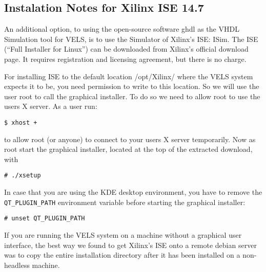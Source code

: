 
\subsection{Instalation Notes for Xilinx ISE 14.7}\label{ISE-install}

An additional option, to using the open-source software ghdl as the VHDL Simulation tool for VELS, is to use the Simulator of Xilinx's ISE: ISim. The ISE (``Full Installer for Linux'') can be downloaded from Xilinx's official download page. It requires registration and licensing agreement, but there is no charge.

For installing ISE to the default location /opt/Xilinx/ where the VELS system expects it to be, you need permission to write to this location. So we will use the user root to call the graphical installer. To do so we need to allow root to use the users X server. As a user run:

\begin{verbatim}
$ xhost +
\end{verbatim}

to allow root (or anyone) to connect to your users X server temporarily. Now as root start the graphical installer, located at the top of the extracted download, with

\begin{verbatim}
# ./xsetup
\end{verbatim}

In case that you are using the KDE desktop environment, you have to remove the \verb!QT_PLUGIN_PATH! environment variable before starting the graphical installer:

\begin{verbatim}
# unset QT_PLUGIN_PATH
\end{verbatim}

If you are running the VELS system on a machine without a graphical user interface, the best way we found to get Xilinx's ISE onto a remote debian server was to copy the entire installation directory after it has been installed on a non-headless machine.
